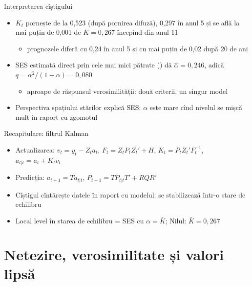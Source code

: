 \begin{frame}{Interpretarea cîștigului}
\itemsize{\small}
\begin{itemize}
    \item $K_t$ pornește de la 0{,}523 (după pornirea difuză), 0{,}297 în anul 5 și se află la mai puțin de 0,001 de $\bar K = 0{,}267$ începînd din anul 11
    \begin{itemize}
        \item prognozele diferă cu 0{,}24 în anul 5 și cu mai puțin de 0{,}02 după 20 de ani
    \end{itemize}
    \item SES estimată direct prin cele mai mici pătrate () dă $\hat\alpha = 0{,}246$, adică $q = \alpha^2/(1-\alpha) = 0{,}080$
    \begin{itemize}
        \item aproape de răspunsul verosimilității: două criterii, un singur model
    \end{itemize}
    \item Perspectiva spațiului stărilor explică SES: $\alpha$ este mare cînd nivelul se mișcă mult în raport cu zgomotul
\end{itemize}
\end{frame}

\begin{frame}{Recapitulare: filtrul Kalman}
\itemsize{\small}
\begin{itemize}
    \item Actualizarea: $v_t = y_t - Z_ta_t$, $F_t = Z_tP_tZ_t' + H$, $K_t = P_tZ_t'F_t^{-1}$, $a_{t|t} = a_t + K_tv_t$
    \item Predicția: $a_{t+1} = Ta_{t|t}$, $P_{t+1} = TP_{t|t}T' + RQR'$
    \item Cîștigul cîntărește datele în raport cu modelul; se stabilizează într-o stare de echilibru
    \item Local level în starea de echilibru = SES cu $\alpha = \bar K$; Nilul: $\bar K = 0{,}267$
\end{itemize}
\end{frame}


\section{Netezire, verosimilitate și valori lipsă}

